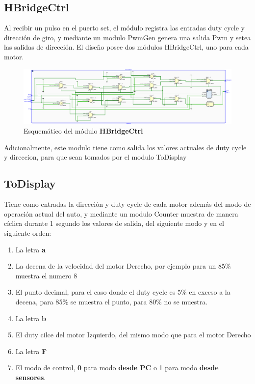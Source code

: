 \documentclass[12pt]{article}
\begin{document}
\subsection{HBridgeCtrl}
Al recibir un pulso en el puerto set, el módulo registra las entradas duty cycle y dirección de giro, y mediante un modulo PwmGen genera una salida Pwm  y setea las salidas de dirección. El diseño posee dos módulos HBridgeCtrl, uno para cada motor.

\begin{figure}[H]
    \centering
    \includegraphics[width=\textwidth]{to-display-crop}
    \caption{Esquemático del módulo \textbf{HBridgeCtrl}}
\end{figure}

Adicionalmente, este modulo tiene como salida los valores actuales de duty cycle y direccion, para que sean tomados por el modulo ToDisplay

\subsection{ToDisplay}

Tiene como entradas la dirección y duty cycle de cada motor además del modo de operación actual del auto, y mediante un modulo Counter muestra de manera cíclica durante 1 segundo los valores de salida, del siguiente modo y en el siguiente orden:
\begin{enumerate}
\footnotesize
\item La letra \textbf{a}
\item La decena de la velocidad del motor Derecho, por ejemplo para un 85\% muestra el numero 8
\item El punto decimal, para el caso donde el duty cycle es 5\% en exceso a la decena, para 85\% se muestra el punto, para 80\% no se muestra.
\item La letra \textbf{b}
\item El duty cilce del motor Izquierdo, del mismo modo que para el motor Derecho
\item La letra \textbf{F}
\item El modo de control, \textbf{0} para modo \textbf{desde PC} o 1 para modo \textbf{desde sensores}.
\end{enumerate}
\end{document}
